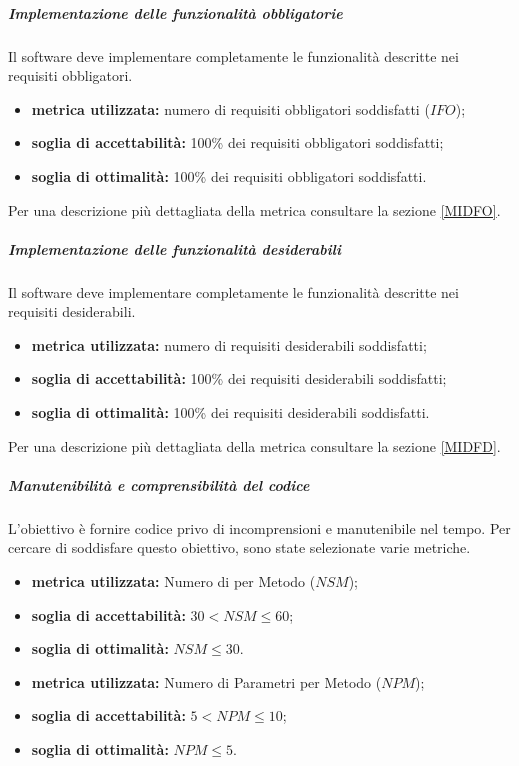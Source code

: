 \subparagraph{Implementazione delle funzionalità obbligatorie}
\label{OIDFO}
Il software deve implementare completamente le funzionalità descritte nei requisiti obbligatori.
\begin{itemize}
	\item \textbf{metrica utilizzata:} numero di requisiti obbligatori soddisfatti ($IFO$);
	\item \textbf{soglia di accettabilità:} 100\% dei requisiti obbligatori soddisfatti;
	\item \textbf{soglia di ottimalità:} 100\% dei requisiti obbligatori soddisfatti.
\end{itemize}
Per una descrizione più dettagliata della metrica consultare la sezione \ref{MIDFO}.

\subparagraph{Implementazione delle funzionalità desiderabili}
\label{OIDFD}
Il software deve implementare completamente le funzionalità descritte nei requisiti desiderabili.
\begin{itemize}
	\item \textbf{metrica utilizzata:} numero di requisiti desiderabili soddisfatti;
	\item \textbf{soglia di accettabilità:} 100\% dei requisiti desiderabili soddisfatti;
	\item \textbf{soglia di ottimalità:} 100\% dei requisiti desiderabili soddisfatti.
\end{itemize}
Per una descrizione più dettagliata della metrica consultare la sezione \ref{MIDFD}.

\medskip

\subparagraph{Manutenibilità e comprensibilità del codice}
\label{OMECDC}
L'obiettivo è fornire codice privo di incomprensioni e manutenibile nel tempo. Per cercare di soddisfare questo obiettivo, sono state selezionate varie metriche.
\begin{itemize}
	\item \textbf{metrica utilizzata:} Numero di  per Metodo ($NSM$);
	\item \textbf{soglia di accettabilità:} $30<NSM\leq60$;
	\item \textbf{soglia di ottimalità:} $NSM\leq30$.
\end{itemize}

\medskip

\begin{itemize}
	\item \textbf{metrica utilizzata:} Numero di Parametri per Metodo ($NPM$);
	\item \textbf{soglia di accettabilità:} $5<NPM \leq 10$;
	\item \textbf{soglia di ottimalità:} $NPM\leq5$.
\end{itemize}	

